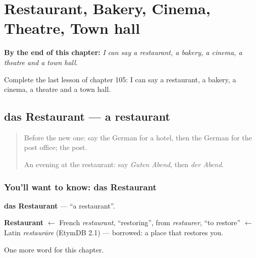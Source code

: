 
\chapter{Restaurant, Bakery, Cinema, Theatre, Town hall}
\label{ch:ge-restaurant-bakery-cinema-theatre-town-hall}

\begin{chapteropening}
\textbf{By the end of this chapter:} \emph{I can say a restaurant, a bakery, a cinema, a theatre and a town hall.}

Complete the last lesson of chapter 105: I can say a restaurant, a bakery, a cinema, a theatre and a town hall.
\end{chapteropening}

\section[das Restaurant]{das Restaurant — a restaurant}

\label{lesson:GE-C105-restaurant}



\begin{quote}
Before the new one: say the German for a hotel, then the German for the post office; the post.

An evening at the restaurant: say \emph{Guten Abend}, then \emph{der Abend}.
\end{quote}

\subsection*{You'll want to know: das Restaurant}
\textbf{das Restaurant} — \textquotedblleft{}a restaurant\textquotedblright{}.

\begin{cousinweb}
\textbf{Restaurant} $\leftarrow$ French \emph{restaurant}, \textquotedblleft{}restoring\textquotedblright{}, from \emph{restaurer}, \textquotedblleft{}to restore\textquotedblright{} $\leftarrow$ Latin \emph{restaurāre} (EtymDB 2.1) — borrowed: a place that restores you.
\end{cousinweb}

\begin{grammarlens}[title={What you've built}]
One more word for this chapter.
\end{grammarlens}

